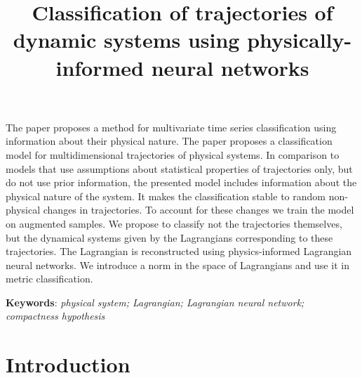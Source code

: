 \documentclass[sn-mathphys-num]{sn-jnl}
\theoremstyle{thmstylethree}
\theoremstyle{thmstyletwo}
\theoremstyle{thmstyleone}
\begin{document}

\title
	[Classification of trajectories of dynamic systems using
physically-informed neural networks] %
    {Classification of trajectories of dynamic systems using
physically-informed neural networks} %
\author*[1]{ }
\author*[2]{ }



\abstract
{The paper proposes a method for multivariate time series classification using information about their physical nature. The paper proposes a classification model for multidimensional trajectories of physical systems. In comparison to models that use assumptions about statistical properties of trajectories only, but do not use  prior information, the presented model includes information about the physical nature of the system. It makes the classification stable to random non-physical changes in trajectories. To account for these changes we train the model on augmented samples. We propose to classify not the trajectories themselves, but the dynamical systems given by the Lagrangians corresponding to these trajectories. The Lagrangian is reconstructed using physics-informed Lagrangian neural networks. We introduce a norm in the space of Lagrangians and use it in metric classification. 

\textbf{Keywords}: \emph{physical system; Lagrangian; Lagrangian neural network; compactness hypothesis}}


\maketitle

\section{Introduction}
\end{document}
